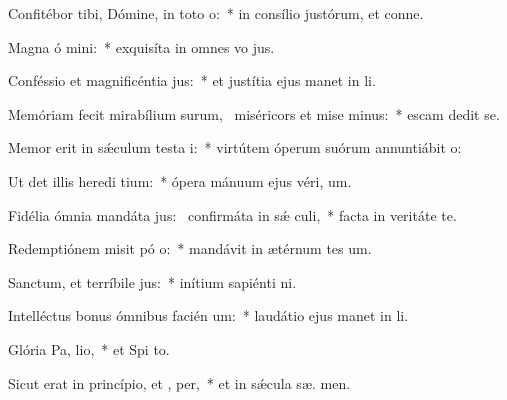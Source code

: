 \item Confitébor tibi, Dómine, in toto  o:~* in consílio justórum, et conne.
\item Magna ó mini:~* exquisíta in omnes vo jus.
\item Conféssio et magnificéntia  jus:~* et justítia ejus manet in  li.
\item Memóriam fecit mirabílium surum,~\pscross{} miséricors et mise minus:~* escam dedit  se.
\item Memor erit in sǽculum testa i:~* virtútem óperum suórum annuntiábit  o:
\item Ut det illis heredi tium:~* ópera mánuum ejus véri,  um.
\item Fidélia ómnia mandáta jus:~\pscross{} confirmáta in sǽ culi,~* facta in veritáte  te.
\item Redemptiónem misit pó o:~* mandávit in ætérnum tes um.
\item Sanctum, et terríbile  jus:~* inítium sapiénti  ni.
\item Intelléctus bonus ómnibus facién um:~* laudátio ejus manet in  li.
\item Glória Pa,  lio,~* et Spi to.
\item Sicut erat in princípio, et ,  per,~* et in sǽcula sæ. men.
